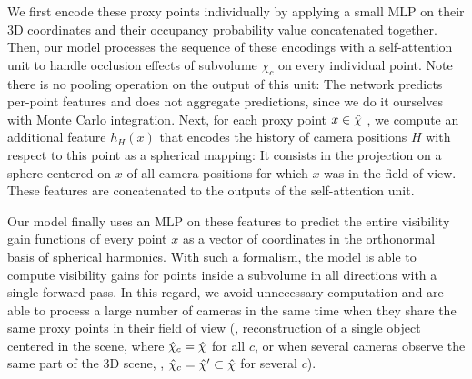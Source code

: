 We first encode these proxy points individually by applying a small MLP on their 3D coordinates and their occupancy probability value concatenated together. Then, our model processes the sequence of these encodings with a self-attention unit to handle occlusion effects of subvolume $\chi_c$ on every individual point. Note there is no pooling operation on the output of this unit: The network predicts per-point features and does not aggregate predictions, since we do it ourselves with Monte Carlo integration. Next, for each proxy point $x\in \hat{\chi}$ , we compute an additional feature $h_H(x)$ that encodes the history of camera positions $H$ with respect to this point as a spherical mapping: It consists in the projection on a sphere centered on $x$ of all camera positions for which $x$ was in the field of view. These features are concatenated to the outputs of the self-attention unit.

Our model finally uses an MLP on these features to predict the entire visibility gain functions of every point $x$ as a vector of coordinates in the orthonormal basis of spherical harmonics. With such a formalism, the model is able to compute visibility gains for points inside a subvolume in all directions with a single forward pass. In this regard, we avoid unnecessary computation and are able to process a large number of cameras in the same time when they share the same proxy points in their field of view (\eg, reconstruction of a single object centered in the scene, where $\hat{\chi}_c=\hat{\chi}$ for all $c$, or when several cameras observe the same part of the 3D scene, \ie, $\hat{\chi}_c=\hat{\chi}'\subset \hat{\chi}$ for several $c$).


